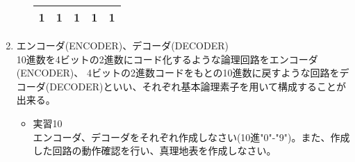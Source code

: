 \documentclass[dvipdfmx]{jsarticle}
\begin{document}
\begin{enumerate}
\begin{itemize}
\begin{table}[H]
\begin{tabular}{|c|c|c|c|c|}
											1 & 1 & 1 & 1 & 1\\ \hline
										\end{tabular}
									\end{table}
							\end{itemize}
						\item エンコーダ(ENCODER)、デコーダ(DECODER) \\
							10進数を4ビットの2進数にコード化するような論理回路をエンコーダ(ENCODER)、
							4ビットの2進数コードをもとの10進数に戻すような回路をデコーダ(DECODER)といい、それぞれ基本論理素子を用いて構成することが出来る。
							\begin{itemize}
								\item 実習10 \\
									エンコーダ、デコーダをそれぞれ作成しなさい(10進"0"-"9")。また、作成した回路の動作確認を行い、真理地表を作成しなさい。
							\end{itemize}
					\end{enumerate}
\end{document}
